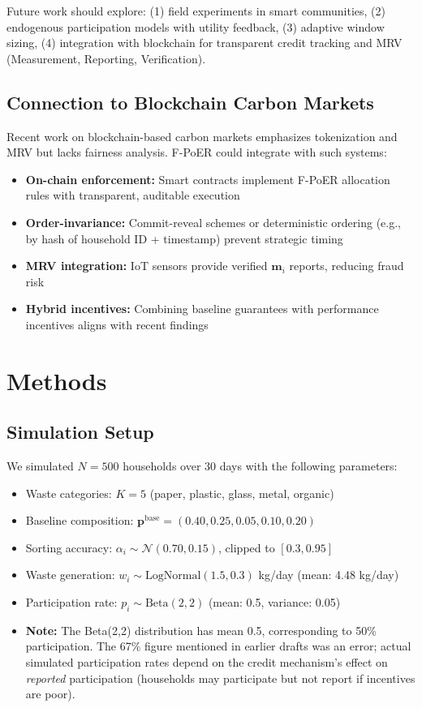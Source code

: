 \documentclass[12pt,a4paper]{article}
\begin{document}
Future work should explore: (1) field experiments in smart communities, (2) endogenous participation models with utility feedback, (3) adaptive window sizing, (4) integration with blockchain for transparent credit tracking and MRV (Measurement, Reporting, Verification)\cite{tang2023blockchain}.

\subsection{Connection to Blockchain Carbon Markets}

Recent work on blockchain-based carbon markets\cite{tang2023blockchain,wang2025blockchain} emphasizes tokenization and MRV but lacks fairness analysis. F-PoER could integrate with such systems:
\begin{itemize}
    \item \textbf{On-chain enforcement:} Smart contracts implement F-PoER allocation rules with transparent, auditable execution\cite{liu2025temporal}
    \item \textbf{Order-invariance:} Commit-reveal schemes or deterministic ordering (e.g., by hash of household ID + timestamp) prevent strategic timing
    \item \textbf{MRV integration:} IoT sensors provide verified $\mathbf{m}_i$ reports, reducing fraud risk\cite{mustafa2025tokenized}
    \item \textbf{Hybrid incentives:} Combining baseline guarantees with performance incentives aligns with recent findings\cite{garcia2025hybrid}
\end{itemize}

\section{Methods}

\subsection{Simulation Setup}

We simulated $N=500$ households over 30 days with the following parameters:
\begin{itemize}
    \item Waste categories: $K=5$ (paper, plastic, glass, metal, organic)
    \item Baseline composition: $\mathbf{p}^{\text{base}} = (0.40, 0.25, 0.05, 0.10, 0.20)$
    \item Sorting accuracy: $\alpha_i \sim \mathcal{N}(0.70, 0.15)$, clipped to $[0.3, 0.95]$
    \item Waste generation: $w_i \sim \text{LogNormal}(1.5, 0.3)$ kg/day (mean: 4.48 kg/day)
    \item Participation rate: $p_i \sim \text{Beta}(2, 2)$ (mean: 0.5, variance: 0.05)
    \item \textbf{Note:} The Beta(2,2) distribution has mean 0.5, corresponding to 50\% participation. The 67\% figure mentioned in earlier drafts was an error; actual simulated participation rates depend on the credit mechanism's effect on \textit{reported} participation (households may participate but not report if incentives are poor).
\end{itemize}
\end{document}
